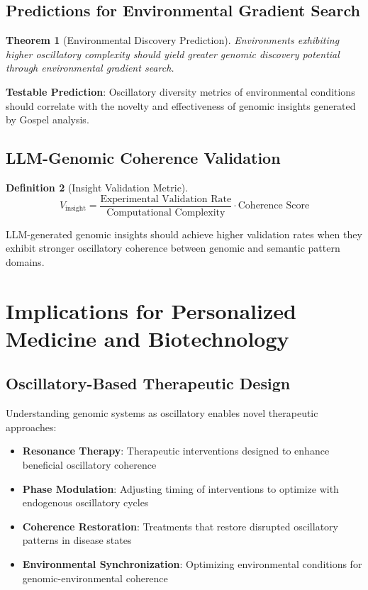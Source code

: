 \documentclass[12pt,a4paper]{article}
\newtheorem{theorem}{Theorem}[section]
\newtheorem{definition}[theorem]{Definition}
\begin{document}
\subsection{Predictions for Environmental Gradient Search}

\begin{theorem}[Environmental Discovery Prediction]
Environments exhibiting higher oscillatory complexity should yield greater genomic discovery potential through environmental gradient search.
\end{theorem}

\textbf{Testable Prediction}: Oscillatory diversity metrics of environmental conditions should correlate with the novelty and effectiveness of genomic insights generated by Gospel analysis.

\subsection{LLM-Genomic Coherence Validation}

\begin{definition}[Insight Validation Metric]
$$V_{\text{insight}} = \frac{\text{Experimental Validation Rate}}{\text{Computational Complexity}} \cdot \text{Coherence Score}$$
\end{definition}

LLM-generated genomic insights should achieve higher validation rates when they exhibit stronger oscillatory coherence between genomic and semantic pattern domains.

\section{Implications for Personalized Medicine and Biotechnology}

\subsection{Oscillatory-Based Therapeutic Design}

Understanding genomic systems as oscillatory enables novel therapeutic approaches:

\begin{itemize}
\item \textbf{Resonance Therapy}: Therapeutic interventions designed to enhance beneficial oscillatory coherence
\item \textbf{Phase Modulation}: Adjusting timing of interventions to optimize with endogenous oscillatory cycles  
\item \textbf{Coherence Restoration}: Treatments that restore disrupted oscillatory patterns in disease states
\item \textbf{Environmental Synchronization}: Optimizing environmental conditions for genomic-environmental coherence
\end{itemize}
\end{document}
